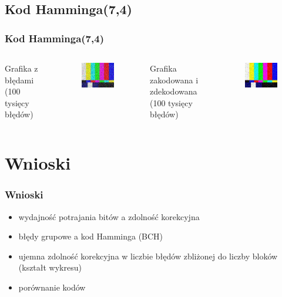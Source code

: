 \documentclass{beamer}
\begin{document}
\subsection{Kod Hamminga(7,4)}
\begin{frame}
\frametitle{Kod Hamminga(7,4)}
    \begin{columns}[c]
        \tiny
        Grafika z błędami (100 tysięcy błędów) 
        \begin{figure}
            \includegraphics[scale=0.5]{zdjecia/grafika 100k bledow.jpg}
        \end{figure}
        
        \tiny
        Grafika zakodowana i zdekodowana (100 tysięcy błędów)
        \begin{figure}
            \includegraphics[scale=0.5]{zdjecia/grafika 100k bledow hamming.jpg}
        \end{figure}
    \end{columns}
\end{frame}

\section{Wnioski}

\begin{frame}
\frametitle{Wnioski}
\begin{itemize}
    \item wydajność potrajania bitów a zdolność korekcyjna
    \item błędy grupowe a kod Hamminga (BCH)
    \item ujemna zdolność korekcyjna w liczbie błędów zbliżonej do liczby bloków (kształt wykresu)
    \item porównanie kodów
\end{itemize}
\end{frame}
\end{document}
